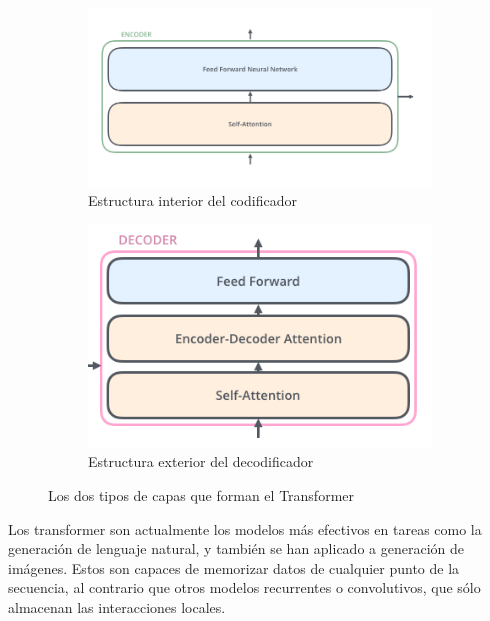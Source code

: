 \begin{figure}[H]
\centering
    \begin{subfigure}{.85\textwidth}
        \centering
        \includegraphics[width=1\linewidth]{imagenes/transformer_encoder.png}
        \caption{Estructura interior del codificador}
        \label{fig:sub1}
    \end{subfigure}%

    \bigskip

    \begin{subfigure}{.5\textwidth}
        \centering
        \includegraphics[width=1\linewidth]{imagenes/transformer_decoder.png}
        \caption{Estructura exterior del decodificador}
    \end{subfigure}

    \caption{Los dos tipos de capas que forman el Transformer \cite{transformers}}
\end{figure}


Los transformer son actualmente los modelos más efectivos en tareas como la generación de lenguaje natural, y también se han aplicado a generación de imágenes. Estos son capaces de memorizar datos de cualquier punto de la secuencia, al contrario que otros modelos recurrentes o convolutivos, que sólo almacenan las interacciones locales. \cite{transformers}



